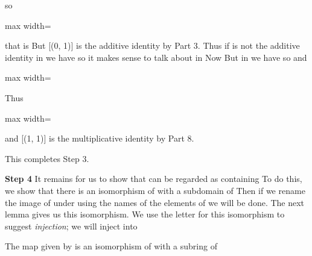 \documentclass[11pt,oneside]{article}
\begin{document}
\begin{BookBody}
\noindent so

\begin{center}\begin{adjustbox}{max width=\linewidth}\end{adjustbox}\end{center}

\noindent that is But [(0, 1)] is the additive identity by Part 3. Thus if \BookInline{[(a,\allowbreak b)]} is not the additive identity in  we have  so it makes sense to talk about \BookInline{[(b,\allowbreak a)]} in  Now  But in  we have  so  and

\begin{center}\begin{adjustbox}{max width=\linewidth}\end{adjustbox}\end{center}

\noindent Thus

\begin{center}\begin{adjustbox}{max width=\linewidth}\BookInline{\displaystyle [(a,\allowbreak b)][(b,\allowbreak a)]= [(1,\allowbreak 1)],\allowbreak }\end{adjustbox}\end{center}

\noindent and [(1, 1)] is the multiplicative identity by Part 8. \BookEnd{\blacklozenge}

This completes Step 3.

\textbf{Step 4} It remains for us to show that  can be regarded as containing  To do this, we show that there is an isomorphism  of  with a subdomain of  Then if we rename the image of  under  using the names of the elements of  we will be done. The next lemma gives us this isomorphism. We use the letter  for this isomorphism to suggest\textit{ injection}; we will inject  into 

 The map  given by  is an isomorphism of  with a subring  of 


\end{BookBody}
\end{document}
